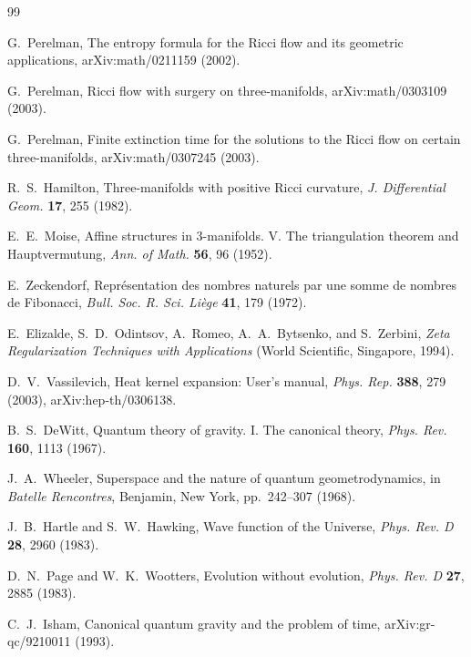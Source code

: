 \documentclass[reprint,aps,prd,letterpaper,superscriptaddress,nofootinbib,longbibliography,floatfix]{revtex4-2}
\theoremstyle{remark}
\begin{document}
\begin{thebibliography}{99}

G.~Perelman,
The entropy formula for the Ricci flow and its geometric applications,
arXiv:math/0211159 (2002).

G.~Perelman,
Ricci flow with surgery on three-manifolds,
arXiv:math/0303109 (2003).

G.~Perelman,
Finite extinction time for the solutions to the Ricci flow on certain three-manifolds,
arXiv:math/0307245 (2003).

R.~S.~Hamilton,
Three-manifolds with positive Ricci curvature,
\textit{J. Differential Geom.} \textbf{17}, 255 (1982).

E.~E.~Moise,
Affine structures in 3-manifolds. V. The triangulation theorem and Hauptvermutung,
\textit{Ann. of Math.} \textbf{56}, 96 (1952).

E.~Zeckendorf,
Repr\'esentation des nombres naturels par une somme de nombres de Fibonacci,
\textit{Bull. Soc. R. Sci. Li\`ege} \textbf{41}, 179 (1972).

E.~Elizalde, S.~D.~Odintsov, A.~Romeo, A.~A.~Bytsenko, and S.~Zerbini,
\textit{Zeta Regularization Techniques with Applications}
(World Scientific, Singapore, 1994).

D.~V.~Vassilevich,
Heat kernel expansion: User's manual,
\textit{Phys. Rep.} \textbf{388}, 279 (2003),
arXiv:hep-th/0306138.

B.~S.~DeWitt,
Quantum theory of gravity. I. The canonical theory,
\textit{Phys. Rev.} \textbf{160}, 1113 (1967).

J.~A.~Wheeler,
Superspace and the nature of quantum geometrodynamics,
in \textit{Batelle Rencontres}, Benjamin, New York, pp.~242--307 (1968).

J.~B.~Hartle and S.~W.~Hawking,
Wave function of the Universe,
\textit{Phys. Rev. D} \textbf{28}, 2960 (1983).

D.~N.~Page and W.~K.~Wootters,
Evolution without evolution,
\textit{Phys. Rev. D} \textbf{27}, 2885 (1983).

C.~J.~Isham,
Canonical quantum gravity and the problem of time,
arXiv:gr-qc/9210011 (1993).


\end{thebibliography}
\end{document}
